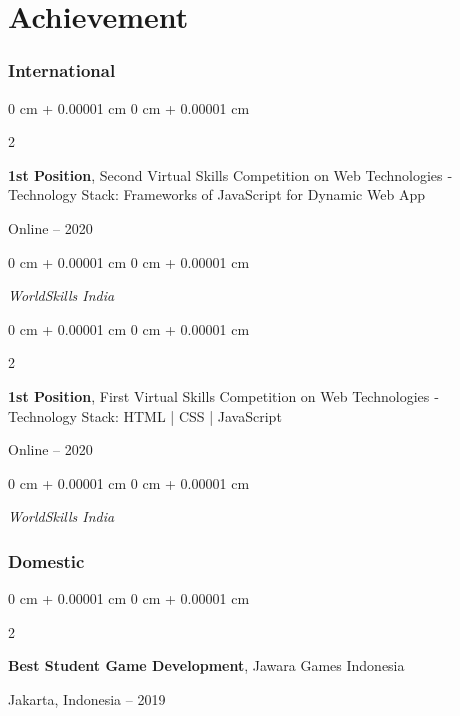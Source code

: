 \documentclass[10pt, letterpaper]{article}
\newenvironment{onecolentry}{
    \begin{adjustwidth}{
        0 cm + 0.00001 cm
    }{
        0 cm + 0.00001 cm
    }
}{
    \end{adjustwidth}
} %
\newenvironment{twocolentry}[2][]{
    \onecolentry
    \def\secondColumn{#2}
    \setcolumnwidth{\fill, 4.5 cm}
    \begin{paracol}{2}
}{
    \switchcolumn \raggedleft \secondColumn
    \end{paracol}
    \endonecolentry
} %
\begin{document}
    \section{Achievement}
        \begin{samepage}
        \subsubsection{International}

        
            \begin{twocolentry}{
                Online -- 2020
            }
                \textbf{1st Position}, 
                Second Virtual Skills Competition on Web Technologies ‑ Technology Stack: Frameworks of JavaScript for Dynamic Web App
            \end{twocolentry}

            \vspace{0.10 cm}
            
            \begin{onecolentry}
                \textit{WorldSkills India}
                \vspace{0.10 cm}
            \end{onecolentry}

        
            \begin{twocolentry}{
                Online -- 2020
            }
                \textbf{1st Position}, 
                First Virtual Skills Competition on Web Technologies ‑ Technology Stack: HTML | CSS | JavaScript
            \end{twocolentry}

            \vspace{0.10 cm}
            
            \begin{onecolentry}
                \textit{WorldSkills India}
            \end{onecolentry}

            
        \subsubsection{Domestic}

        
            \begin{twocolentry}{
                Jakarta, Indonesia -- 2019
            }
                \textbf{Best Student Game Development}, 
                Jawara Games Indonesia
            \end{twocolentry}


\end{samepage}
\end{document}
